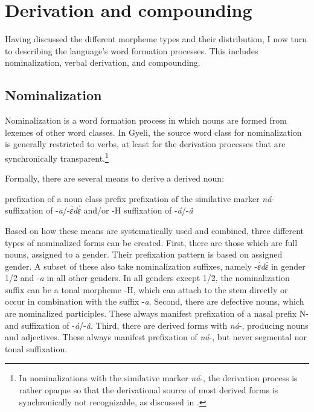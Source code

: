 \section{Derivation and compounding}
\label{sec:FormProcess}


Having discussed the different morpheme types and their distribution, I now turn to describing the language's word formation processes. This includes nominalization, verbal derivation, and compounding.


\largerpage[-2]
\subsection{Nominalization}
\label{sec:NOM}


Nominalization is a word formation process in which nouns are formed from lexemes of other word classes. In Gyeli, the source word class for nominalization is generally restricted to verbs, at least for the derivation processes that are synchronically transparent.\footnote{In nominalizations with the similative marker {\itshape ná}-, the derivation process is rather opaque so that the derivational source of most derived forms is synchronically not recognizable, as discussed in .}

Formally, there are several means to derive  a derived noun:
\begin{enumerate}[label=(\roman*)]
\itshapeem prefixation of a noun class prefix 
\itshapeem prefixation of the similative marker {\itshape ná}-
\itshapeem suffixation of -{\itshape a}/-{\itshape ɛ̀dɛ̀} and/or -H
\itshapeem suffixation of -{\itshape á}/-{\itshape â}
\end{enumerate}

\noindent Based on how these means are systematically used and combined, three different types of nominalized forms can be created.  First, there are those which are full nouns, assigned to a gender. Their prefixation pattern is based on assigned gender. A subset of these also take nominalization suffixes, namely -{\itshape ɛ̀dɛ̀} in gender 1/2 and -{\itshape a} in all other genders. In all genders except 1/2, the nominalization suffix can be a tonal morpheme -H, which can attach to the stem directly or occur in combination with the suffix -{\itshape a}. Second, there are defective nouns, which are nominalized participles.  These always manifest prefixation of a nasal prefix N- and  suffixation of -{\itshape á}/-{\itshape â}.   Third, there are  derived forms with {\itshape ná}-, producing nouns and adjectives. These always manifest prefixation of {\itshape ná}-, but never segmental nor tonal suffixation. 


